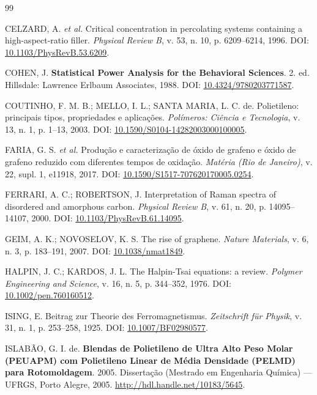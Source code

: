 \documentclass[12pt,a4paper,twoside]{article}
\begin{document}
\begin{thebibliography}{99}

CELZARD, A. \textit{et al.} Critical concentration in percolating systems containing a high-aspect-ratio filler. \textit{Physical Review B}, v. 53, n. 10, p. 6209--6214, 1996. DOI: \href{https://doi.org/10.1103/PhysRevB.53.6209}{10.1103/PhysRevB.53.6209}.

COHEN, J. \textbf{Statistical Power Analysis for the Behavioral Sciences}. 2. ed. Hillsdale: Lawrence Erlbaum Associates, 1988. DOI: \href{https://doi.org/10.4324/9780203771587}{10.4324/9780203771587}.

COUTINHO, F. M. B.; MELLO, I. L.; SANTA MARIA, L. C. de. Polietileno: principais tipos, propriedades e aplicações. \textit{Polímeros: Ciência e Tecnologia}, v. 13, n. 1, p. 1--13, 2003. DOI: \href{https://doi.org/10.1590/S0104-14282003000100005}{10.1590/S0104-14282003000100005}.

FARIA, G. S. \textit{et al.} Produção e caracterização de óxido de grafeno e óxido de grafeno reduzido com diferentes tempos de oxidação. \textit{Matéria (Rio de Janeiro)}, v. 22, supl. 1, e11918, 2017. DOI: \href{https://doi.org/10.1590/S1517-707620170005.0254}{10.1590/S1517-707620170005.0254}.

FERRARI, A. C.; ROBERTSON, J. Interpretation of Raman spectra of disordered and amorphous carbon. \textit{Physical Review B}, v. 61, n. 20, p. 14095--14107, 2000. DOI: \href{https://doi.org/10.1103/PhysRevB.61.14095}{10.1103/PhysRevB.61.14095}.

GEIM, A. K.; NOVOSELOV, K. S. The rise of graphene. \textit{Nature Materials}, v. 6, n. 3, p. 183--191, 2007. DOI: \href{https://doi.org/10.1038/nmat1849}{10.1038/nmat1849}.

HALPIN, J. C.; KARDOS, J. L. The Halpin-Tsai equations: a review. \textit{Polymer Engineering and Science}, v. 16, n. 5, p. 344--352, 1976. DOI: \href{https://doi.org/10.1002/pen.760160512}{10.1002/pen.760160512}.

ISING, E. Beitrag zur Theorie des Ferromagnetismus. \textit{Zeitschrift für Physik}, v. 31, n. 1, p. 253--258, 1925. DOI: \href{https://doi.org/10.1007/BF02980577}{10.1007/BF02980577}.

ISLABÃO, G. I. de. \textbf{Blendas de Polietileno de Ultra Alto Peso Molar (PEUAPM) com Polietileno Linear de Média Densidade (PELMD) para Rotomoldagem}. 2005. Dissertação (Mestrado em Engenharia Química) — UFRGS, Porto Alegre, 2005. \url{http://hdl.handle.net/10183/5645}.


\end{thebibliography}
\end{document}
